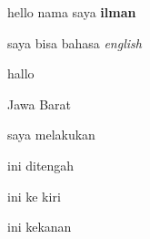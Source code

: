 \documentclass[12pt]{article}
\begin{document}
	hello nama saya \textbf{ilman}
	
	saya bisa bahasa \textit{english}
	
	hallo \begin{large}
		Jawa Barat
	\end{large}
	
	saya melakukan 
	\begin{center}
		ini ditengah
	\end{center}
	\begin{flushleft}
		ini ke kiri
	\end{flushleft}
	\begin{flushright}
		ini kekanan
	\end{flushright}
\end{document}
